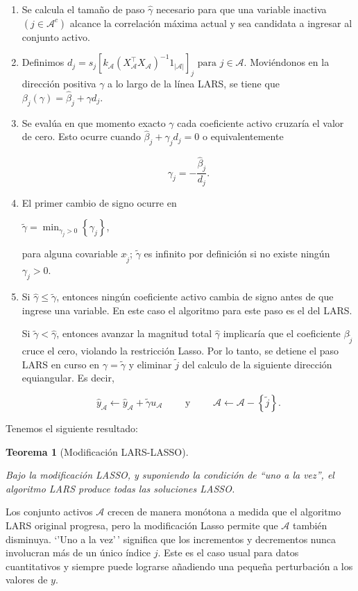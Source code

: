 \documentclass[
  letterpaper,
  DIV=11,
  numbers=noendperiod]{scrreprt}
\theoremstyle{plain}
\newtheorem{theorem}{Teorema}[chapter]
\theoremstyle{definition}
\theoremstyle{remark}
\begin{document}
\begin{enumerate}
\def\labelenumi{\arabic{enumi}.}
\item
  Se calcula el tamaño de paso \(\hat{\gamma}\) necesario para que una
  variable inactiva \((j\in\mathcal{A}^{c})\) alcance la correlación
  máxima actual y sea candidata a ingresar al conjunto activo.
\item
  Definimos
  \(d_{j}=s_{j}\left[k_{\mathcal{A}}\left(X_{\mathcal{A}}^{\top}X_{\mathcal{A}}\right)^{-1}1_{|\mathcal{A}|} \right]_{j} \text{ para } j\in\mathcal{A}\).
  Moviéndonos en la dirección positiva \(\gamma\) a lo largo de la línea
  LARS, se tiene que \(\beta_{j}(\gamma)=\hat{\beta}_{j}+\gamma d_{j}\).
\item
  Se evalúa en que momento exacto \(\gamma\) cada coeficiente activo
  cruzaría el valor de cero. Esto ocurre cuando
  \(\hat{\beta}_{j}+\gamma_{j}d_{j}=0\) o equivalentemente

  \[\gamma_{j}=-\frac{\hat{\beta}_{j}}{d_{j}}.\]
\item
  El primer cambio de signo ocurre en

  \(\widetilde{\gamma}=\min_{\gamma_{j}>0}\left\{ \gamma_{j}\right\}\),

  para alguna covariable \(x_{\widetilde{j}}\); \(\widetilde{\gamma}\)
  es infinito por definición si no existe ningún \(\gamma_{j}>0\).
\item
  Si \(\hat{\gamma}\leq \widetilde{\gamma}\), entonces ningún
  coeficiente activo cambia de signo antes de que ingrese una variable.
  En este caso el algoritmo para este paso es el del LARS.

  Si \(\widetilde{\gamma}<\hat{\gamma}\), entonces avanzar la magnitud
  total \(\hat{\gamma}\) implicaría que el coeficiente
  \(\beta_{\widetilde{j}}\) cruce el cero, violando la restricción
  Lasso. Por lo tanto, se detiene el paso LARS en curso en
  \(\gamma=\widetilde{\gamma}\) y eliminar \(\widetilde{j}\) del calculo
  de la siguiente dirección equiangular. Es decir,

  \[ \hat{y}_{\mathcal{A}}\leftarrow \hat{y}_{\mathcal{A}}+\widetilde{\gamma}u_{\mathcal{A}}\quad \quad \text{ y }\quad\quad \mathcal{A}\leftarrow\mathcal{A}-\left\{ \widetilde{j}\right\}. \]
\end{enumerate}

Tenemos el siguiente resultado:

\begin{theorem}[Modificación
LARS-LASSO]\protect\hypertarget{thm-lasso}{}\label{thm-lasso}

Bajo la modificación LASSO, y suponiendo la condición de ``uno a la
vez'', el algoritmo LARS produce todas las soluciones LASSO.

\end{theorem}

Los conjunto activos \(\mathcal{A}\) crecen de manera monótona a medida
que el algoritmo LARS original progresa, pero la modificación Lasso
permite que \(\mathcal{A}\) también disminuya. `'Uno a la vez'\,'
significa que los incrementos y decrementos nunca involucran más de un
único índice \(j\). Este es el caso usual para datos cuantitativos y
siempre puede lograrse añadiendo una pequeña perturbación a los valores
de \(y\).
\end{document}
